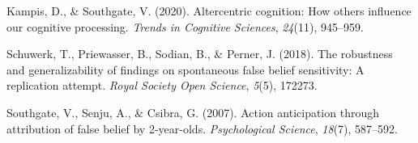 \documentclass[
  english,
  man, donotrepeattitle,floatsintext]{apa6}
\newlength{\cslhangindent}
\newlength{\cslentryspacingunit} %
\newenvironment{CSLReferences}[2] %
 {%
  \setlength{\parindent}{0pt}
  \ifodd #1
  \let\oldpar\par
  \def\par{\hangindent=\cslhangindent\oldpar}
  \fi
  \setlength{\parskip}{#2\cslentryspacingunit}
 }%
 {}
\begin{document}
\begingroup
\setlength{\parindent}{-0.5in}
\setlength{\leftskip}{0.5in}

\hypertarget{refs}{}
\begin{CSLReferences}{1}{0}
\leavevmode{}%
Kampis, D., \& Southgate, V. (2020). Altercentric cognition: How others influence our cognitive processing. \emph{Trends in Cognitive Sciences}, \emph{24}(11), 945--959.

\leavevmode{}%
Schuwerk, T., Priewasser, B., Sodian, B., \& Perner, J. (2018). The robustness and generalizability of findings on spontaneous false belief sensitivity: A replication attempt. \emph{Royal Society Open Science}, \emph{5}(5), 172273.

\leavevmode{}%
Southgate, V., Senju, A., \& Csibra, G. (2007). Action anticipation through attribution of false belief by 2-year-olds. \emph{Psychological Science}, \emph{18}(7), 587--592.

\end{CSLReferences}

\endgroup
\end{document}
